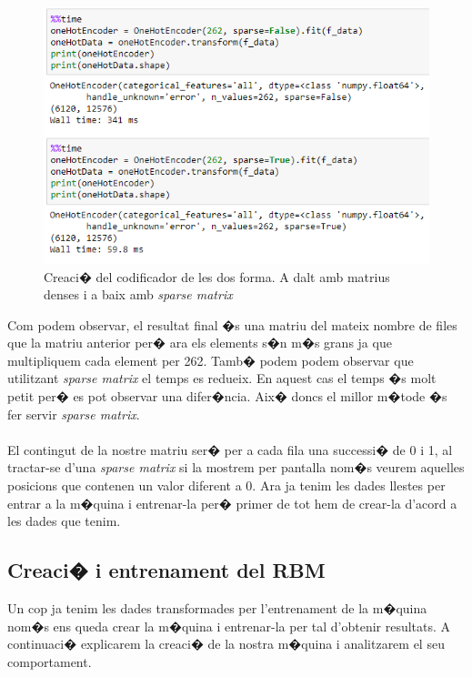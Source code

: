 \documentclass[12pt,a4paper,openright,oneside]{article}
\numberwithin{equation}{section}
\theoremstyle{definition}
\begin{document}
\begin{figure}[h!]
\begin{center}
\includegraphics[width=\textwidth]{onehotencoder}
\caption{Creaci� del codificador de les dos forma. A dalt amb matrius denses i a baix amb \textit{sparse matrix}}
\end{center}
\end{figure}
Com podem observar, el resultat final �s una matriu del mateix nombre de files que la matriu anterior per� ara els elements s�n m�s grans ja que multipliquem cada element per 262. Tamb� podem podem observar que utilitzant \textit{sparse matrix} el temps es redueix. En aquest cas el temps �s molt petit per� es pot observar una difer�ncia. Aix� doncs el millor m�tode �s fer servir \textit{sparse matrix}. \\\\
El contingut de la nostre matriu ser� per a cada fila una successi� de 0 i 1, al tractar-se d'una \textit{sparse matrix} si la mostrem per pantalla nom�s veurem aquelles posicions que contenen un valor diferent a 0.
Ara ja tenim les dades llestes per entrar a la m�quina i entrenar-la per� primer de tot hem de crear-la d'acord a les dades que tenim.
\subsection{Creaci� i entrenament del RBM}
Un cop ja tenim les dades transformades per l'entrenament de la m�quina nom�s ens queda crear la m�quina i entrenar-la per tal d'obtenir resultats. A continuaci� explicarem la creaci� de la nostra m�quina i analitzarem el seu comportament.
\end{document}
